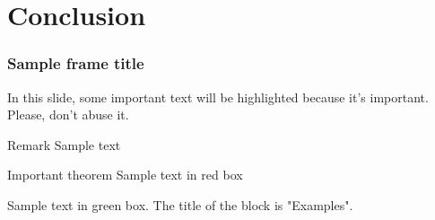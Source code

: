 \documentclass{beamer}
\begin{document}
\section{Conclusion}

\begin{frame}
	\frametitle{Sample frame title}
	
	In this slide, some important text will be
	\alert{highlighted} because it's important.
	Please, don't abuse it.
	
	\begin{block}{Remark}
	Sample text
	\end{block}
	
	\begin{alertblock}{Important theorem}
	Sample text in red box
	\end{alertblock}
	
	\begin{examples}
	Sample text in green box. The title of the block is "Examples".
	\end{examples}
\end{frame}
\end{document}
